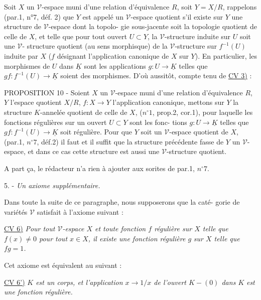 Soit $X$ un $\mathcal{V}$-espace muni d'une relation d'équivalence $R$, soit
$Y=X/R$, rappelons (par.1, n°7, déf. 2) que $Y$ est appelé un $\mathcal{V}$-espace
quotient s'il existe sur $Y$ une structure de $\mathcal{V}$-espace dont la topolo-
gie sous-jacente soit la topologie quotient de celle de $X$, et telle que
pour tout ouvert $U \subset Y$, la $\mathcal{V}$-structure induite sur $U$ soit une $\mathcal{V}$-
structure quotient (au sens morphisque) de la $\mathcal{V}$-structure sur $f^{-1}(U)$
induite par $X$ ($f$ désignant l'application canonique de $X$ sur $Y$). En
particulier, les morphismes de $U$ dans $\underline{K}$ sont les applications $g:U \to \underline{K}$
telles que $gf: f^{-1}(U) \to \underline{K}$ soient des morphismes. D'où aussitôt, compte
tenu de \underline{CV 3)} :

\newpage



PROPOSITION 10 - Soient $X$ un $\mathcal{V}$-espace muni d'une relation d'équivalence
$R$, $Y$ l'espace quotient $X/R$, $f:X \to Y$ l'application canonique, mettons sur
$Y$ la structure $K$-annelée quotient de celle de $X$, ($n^\circ 1$, prop.2, cor.1),
pour laquelle les fonctions régulières sur un ouvert $U \subset Y$ sont les fonc-
tions $g:U \to \underline{K}$ telles que $gf: f^{-1}(U) \to \underline{K}$ soit régulière. Pour que $Y$ soit
un $\mathcal{V}$-espace quotient de $X$, (par.1, $n^\circ 7$, déf.2) il faut et il suffit
que la structure précédente fasse de $Y$ un $\mathcal{V}$-espace, et dans ce cas
cette structure est aussi une $\mathcal{V}$-structure quotient.

A part ça, le rédacteur n'a rien à ajouter aux sorites de par.1,
$n^\circ 7$.

5. - \emph{Un axiome supplémentaire.}

Dans toute la suite de ce paragraphe, nous supposerons que la caté-
gorie de variétés $\mathcal{V}$ satisfait à l'axiome suivant :

\underline{CV 6)} \emph{Pour tout $\mathcal{V}$-espace $X$ et toute fonction $f$ régulière sur $X$ telle}
\emph{que $f(x) \neq 0$ pour tout $x \in X$, il existe une fonction régulière $g$}
\emph{sur $X$ telle que $fg = 1$.}

Cet axiome est équivalent au suivant :

\underline{CV 6')} \emph{$K$ est un corps, et l'application $x \to 1/x$ de l'ouvert $K-(0)$ dans $K$}
\emph{est une fonction régulière.}

